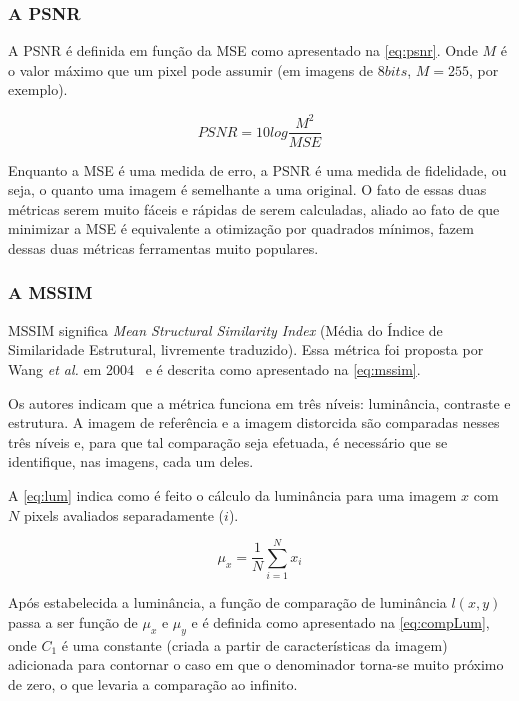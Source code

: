 \subsubsection{A PSNR}

A PSNR é definida em função da MSE como apresentado na \autoref{eq:psnr}. Onde $M$ é o valor máximo que um pixel pode assumir (em imagens de $8 bits$, $M=255$, por exemplo).

\begin{equation}\label{eq:psnr}
	PSNR = 10log\frac{M^2}{MSE}
\end{equation}

Enquanto a MSE é uma medida de erro, a PSNR é uma medida de fidelidade, ou seja, o quanto uma imagem é semelhante a uma original. O fato de essas duas métricas serem muito fáceis e rápidas de serem calculadas, aliado ao fato de que minimizar a MSE é equivalente a otimização por quadrados mínimos, fazem dessas duas métricas ferramentas muito populares.

\subsubsection{A MSSIM}

MSSIM significa \emph{Mean Structural Similarity Index} (Média do Índice de Similaridade Estrutural, livremente traduzido). Essa métrica foi proposta por Wang \emph{et al.} em 2004~\cite{mssim2004} e é descrita como apresentado na \autoref{eq:mssim}.

Os autores indicam que a métrica funciona em três níveis: luminância, contraste e estrutura. A imagem de referência e a imagem distorcida são comparadas nesses três níveis e, para que tal comparação seja efetuada, é necessário que se identifique, nas imagens, cada um deles.

A \autoref*{eq:lum} indica como é feito o cálculo da luminância para uma imagem $x$ com $N$ pixels avaliados separadamente ($i$).

\begin{equation}\label{eq:lum}
	\mu_x = \frac{1}{N}\sum^{N}_{i=1}x_i
\end{equation}

Após estabelecida a luminância, a função de comparação de luminância $l(x,y)$ passa a ser função de $\mu_x$ e $\mu_y$ e é definida como apresentado na \autoref*{eq:compLum}, onde $C_1$ é uma constante (criada a partir de características da imagem) adicionada para contornar o caso em que o denominador torna-se muito próximo de zero, o que levaria a comparação ao infinito.


